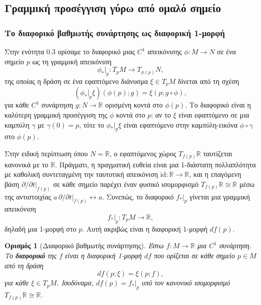 \documentclass[11pt,a4paper,twoside,openright]{book}
\newtheorem{definition}[lemma]{Ορισμός}
\begin{document}
\subsection{Γραμμική προσέγγιση γύρω από ομαλό σημείο}

\subsubsection{Το διαφορικό βαθμωτής συνάρτησης ως διαφορική 1-μορφή}
	\label{sec:scalar-differential}

Στην ενότητα 0.3 ορίσαμε το διαφορικό μιας $C^1$ απεικόνισης $\phi: M \to N$ σε ένα σημείο $p$ ως τη γραμμική απεικόνιση
\begin{equation}
\phi_*|_p: T_pM \to T_{\phi(p)}N,
\end{equation}
της οποίας η δράση σε ένα εφαπτόμενο διάνυσμα $\xi \in T_pM$ δίνεται από τη σχέση
\begin{equation}
(\phi_*|_p \xi)(\phi(p); g) = \xi(p; g \circ \phi),
\end{equation}
για κάθε $C^1$ συνάρτηση $g: N \to \mathbb{R}$ ορισμένη κοντά στο $\phi(p)$. Το διαφορικό είναι η καλύτερη γραμμική προσέγγιση της $\phi$ κοντά στο $p$: αν το $\xi$ είναι εφαπτόμενο σε μια καμπύλη $\gamma$ με $\gamma(0) = p$, τότε το $\phi_*|_p \xi$ είναι εφαπτόμενο στην καμπύλη-εικόνα $\phi \circ \gamma$ στο $\phi(p)$.

Στην ειδική περίπτωση όπου $N = \mathbb{R}$, ο εφαπτόμενος χώρος $T_{f(p)}\mathbb{R}$ ταυτίζεται κανονικά με το $\mathbb{R}$. Πράγματι, η πραγματική ευθεία είναι μια 1-διάστατη πολλαπλότητα με καθολική συντεταγμένη την ταυτοτική απεικόνιση $\mathrm{id}: \mathbb{R} \to \mathbb{R}$, και η επαγόμενη βάση $\partial / \partial t|_{f(p)}$ σε κάθε σημείο παρέχει έναν φυσικό ισομορφισμό $T_{f(p)}\mathbb{R} \cong \mathbb{R}$ μέσω της αντιστοιχίας $a \, \partial / \partial t|_{f(p)} \leftrightarrow a$. Συνεπώς, το διαφορικό $f_*|_p$ γίνεται μια γραμμική απεικόνιση
\begin{equation}
f_*|_p: T_pM \to \mathbb{R},
\end{equation}
δηλαδή μια 1-μορφή στο $p$. Αυτή ακριβώς είναι η διαφορική 1-μορφή $df(p)$.

\begin{definition}[Διαφορικό βαθμωτής συνάρτησης]
Έστω $f: M \to \mathbb{R}$ μια $C^1$ συνάρτηση. Το \textbf{διαφορικό} της $f$ είναι η διαφορική 1-μορφή $df$ που ορίζεται σε κάθε σημείο $p \in M$ από τη δράση
\begin{equation}
df(p; \xi) = \xi(p; f),
\end{equation}
για κάθε $\xi \in T_pM$. Ισοδύναμα, $df(p) = f_*|_p$ υπό τον κανονικό ισομορφισμό $T_{f(p)}\mathbb{R} \cong \mathbb{R}$.
\end{definition}
\end{document}

